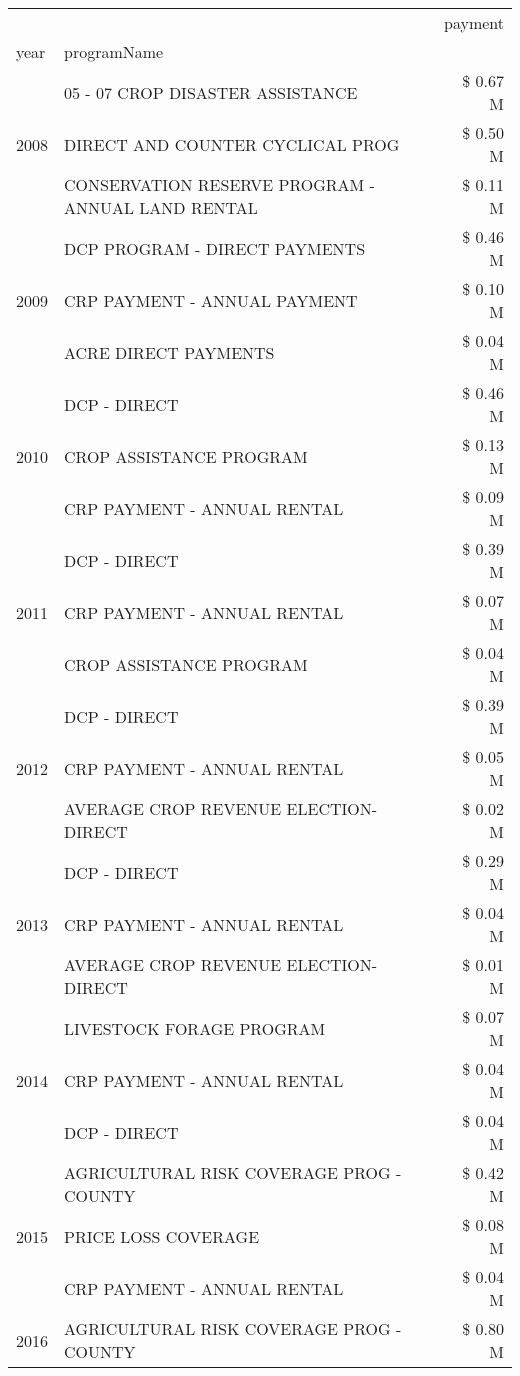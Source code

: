 \begin{tabular}{llr}
\toprule
 &  & payment \\
year & programName &  \\
\midrule
\multirow[t]{3}{*}{2008} & 05 - 07 CROP DISASTER ASSISTANCE & \$ 0.67 M \\
 & DIRECT AND COUNTER CYCLICAL PROG & \$ 0.50 M \\
 & CONSERVATION RESERVE PROGRAM - ANNUAL LAND RENTAL & \$ 0.11 M \\
\cline{1-3}
\multirow[t]{3}{*}{2009} & DCP PROGRAM - DIRECT PAYMENTS & \$ 0.46 M \\
 & CRP PAYMENT - ANNUAL PAYMENT & \$ 0.10 M \\
 & ACRE DIRECT PAYMENTS & \$ 0.04 M \\
\cline{1-3}
\multirow[t]{3}{*}{2010} & DCP - DIRECT & \$ 0.46 M \\
 & CROP ASSISTANCE PROGRAM & \$ 0.13 M \\
 & CRP PAYMENT - ANNUAL RENTAL & \$ 0.09 M \\
\cline{1-3}
\multirow[t]{3}{*}{2011} & DCP - DIRECT & \$ 0.39 M \\
 & CRP PAYMENT - ANNUAL RENTAL & \$ 0.07 M \\
 & CROP ASSISTANCE PROGRAM & \$ 0.04 M \\
\cline{1-3}
\multirow[t]{3}{*}{2012} & DCP - DIRECT & \$ 0.39 M \\
 & CRP PAYMENT - ANNUAL RENTAL & \$ 0.05 M \\
 & AVERAGE CROP REVENUE ELECTION-DIRECT & \$ 0.02 M \\
\cline{1-3}
\multirow[t]{3}{*}{2013} & DCP - DIRECT & \$ 0.29 M \\
 & CRP PAYMENT - ANNUAL RENTAL & \$ 0.04 M \\
 & AVERAGE CROP REVENUE ELECTION-DIRECT & \$ 0.01 M \\
\cline{1-3}
\multirow[t]{3}{*}{2014} & LIVESTOCK FORAGE PROGRAM & \$ 0.07 M \\
 & CRP PAYMENT - ANNUAL RENTAL & \$ 0.04 M \\
 & DCP - DIRECT & \$ 0.04 M \\
\cline{1-3}
\multirow[t]{3}{*}{2015} & AGRICULTURAL RISK COVERAGE PROG - COUNTY & \$ 0.42 M \\
 & PRICE LOSS COVERAGE & \$ 0.08 M \\
 & CRP PAYMENT - ANNUAL RENTAL & \$ 0.04 M \\
\cline{1-3}
\multirow[t]{3}{*}{2016} & AGRICULTURAL RISK COVERAGE PROG - COUNTY & \$ 0.80 M \\

\end{tabular}

